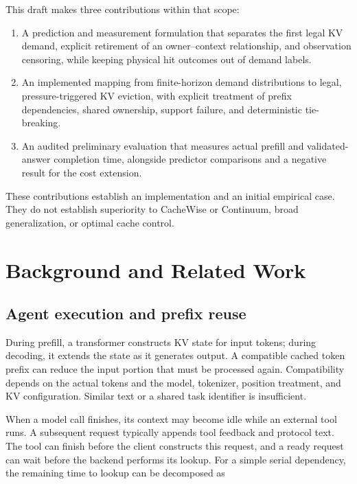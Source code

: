 \documentclass[sigconf, screen, review]{acmart}
\providecommand{\tightlist}{\setlength{\itemsep}{0pt}\setlength{\parskip}{0pt}}
\begin{document}
This draft makes three contributions within that scope:

\begin{enumerate}
\def\labelenumi{\arabic{enumi}.}
\tightlist
\item
  A prediction and measurement formulation that separates the first
  legal KV demand, explicit retirement of an owner--context
  relationship, and observation censoring, while keeping physical hit
  outcomes out of demand labels.
\item
  An implemented mapping from finite-horizon demand distributions to
  legal, pressure-triggered KV eviction, with explicit treatment of
  prefix dependencies, shared ownership, support failure, and
  deterministic tie-breaking.
\item
  An audited preliminary evaluation that measures actual prefill and
  validated-answer completion time, alongside predictor comparisons and
  a negative result for the cost extension.
\end{enumerate}

These contributions establish an implementation and an initial empirical
case. They do not establish superiority to CacheWise or Continuum, broad
generalization, or optimal cache control.

\section{Background and Related
Work}\label{background-and-related-work}

\subsection{Agent execution and prefix
reuse}\label{agent-execution-and-prefix-reuse}

During prefill, a transformer constructs KV state for input tokens;
during decoding, it extends the state as it generates output. A
compatible cached token prefix can reduce the input portion that must be
processed again. Compatibility depends on the actual tokens and the
model, tokenizer, position treatment, and KV configuration. Similar text
or a shared task identifier is insufficient.

When a model call finishes, its context may become idle while an
external tool runs. A subsequent request typically appends tool feedback
and protocol text. The tool can finish before the client constructs this
request, and a ready request can wait before the backend performs its
lookup. For a simple serial dependency, the remaining time to lookup can
be decomposed as
\end{document}
